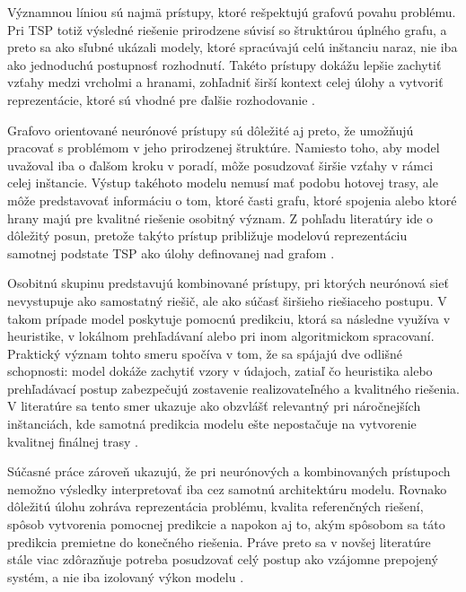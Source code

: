 Významnou líniou sú najmä prístupy, ktoré rešpektujú grafovú povahu problému.
Pri TSP totiž výsledné riešenie prirodzene súvisí so štruktúrou úplného grafu,
a preto sa ako sľubné ukázali modely, ktoré spracúvajú celú inštanciu naraz,
nie iba ako jednoduchú postupnosť rozhodnutí. Takéto prístupy dokážu lepšie
zachytiť vzťahy medzi vrcholmi a hranami, zohľadniť širší kontext celej úlohy
a vytvoriť reprezentácie, ktoré sú vhodné pre ďalšie rozhodovanie
\parencite{joshi2019gcn,cappart2023gnnco,joshi2022generalization}.

Grafovo orientované neurónové prístupy sú dôležité aj preto, že umožňujú
pracovať s problémom v jeho prirodzenej štruktúre. Namiesto toho, aby model
uvažoval iba o ďalšom kroku v poradí, môže posudzovať širšie vzťahy v rámci
celej inštancie. Výstup takéhoto modelu nemusí mať podobu hotovej trasy, ale
môže predstavovať informáciu o tom, ktoré časti grafu, ktoré spojenia alebo
ktoré hrany majú pre kvalitné riešenie osobitný význam. Z pohľadu literatúry
ide o dôležitý posun, pretože takýto prístup približuje modelovú reprezentáciu
samotnej podstate TSP ako úlohy definovanej nad grafom
\parencite{joshi2019gcn,joshi2022generalization}.

Osobitnú skupinu predstavujú kombinované prístupy, pri ktorých neurónová sieť
nevystupuje ako samostatný riešič, ale ako súčasť širšieho riešiaceho postupu.
V takom prípade model poskytuje pomocnú predikciu, ktorá sa následne využíva
v heuristike, v lokálnom prehľadávaní alebo pri inom algoritmickom spracovaní.
Praktický význam tohto smeru spočíva v tom, že sa spájajú dve odlišné
schopnosti: model dokáže zachytiť vzory v údajoch, zatiaľ čo heuristika alebo
prehľadávací postup zabezpečujú zostavenie realizovateľného a kvalitného
riešenia. V literatúre sa tento smer ukazuje ako obzvlášť relevantný pri
náročnejších inštanciách, kde samotná predikcia modelu ešte nepostačuje
na vytvorenie kvalitnej finálnej trasy
\parencite{hudson2022gls,xin2021neurolkh,bengio2021mlco}.

Súčasné práce zároveň ukazujú, že pri neurónových a kombinovaných prístupoch
nemožno výsledky interpretovať iba cez samotnú architektúru modelu. Rovnako
dôležitú úlohu zohráva reprezentácia problému, kvalita referenčných riešení,
spôsob vytvorenia pomocnej predikcie a napokon aj to, akým spôsobom sa táto
predikcia premietne do konečného riešenia. Práve preto sa v novšej literatúre
stále viac zdôrazňuje potreba posudzovať celý postup ako vzájomne prepojený
systém, a nie iba izolovaný výkon modelu
\parencite{joshi2022generalization,bengio2021mlco}.

